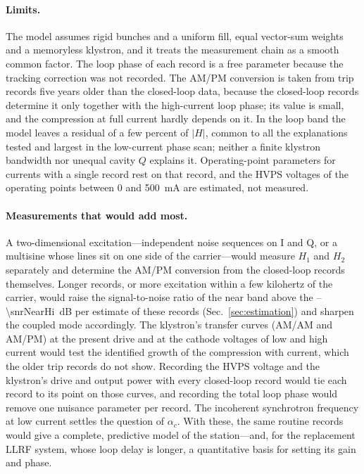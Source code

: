\paragraph{Limits.} The model assumes rigid bunches and a uniform fill, equal vector-sum weights and a memoryless klystron, and it treats the measurement chain as a smooth common factor. The loop phase of each record is a free parameter because the tracking correction was not recorded. The AM/PM conversion is taken from trip records five years older than the closed-loop data, because the closed-loop records determine it only together with the high-current loop phase; its value is small, and the compression at full current hardly depends on it. In the loop band the model leaves a residual of a few percent of $|H|$, common to all the explanations tested and largest in the low-current phase scan; neither a finite klystron bandwidth nor unequal cavity $Q$ explains it. Operating-point parameters for currents with a single record rest on that record, and the HVPS voltages of the operating points between \SI{0}{} and \SI{500}{mA} are estimated, not measured.

\paragraph{Measurements that would add most.} A two-dimensional excitation---independent noise sequences on I and Q, or a multisine whose lines sit on one side of the carrier---would measure $H_1$ and $H_2$ separately and determine the AM/PM conversion from the closed-loop records themselves. Longer records, or more excitation within a few kilohertz of the carrier, would raise the signal-to-noise ratio of the near band above the \snrNearLo--\SI{\snrNearHi}{dB} per estimate of these records (Sec.~\ref{sec:estimation}) and sharpen the coupled mode accordingly. The klystron's transfer curves (AM/AM and AM/PM) at the present drive and at the cathode voltages of low and high current would test the identified growth of the compression with current, which the older trip records do not show. Recording the HVPS voltage and the klystron's drive and output power with every closed-loop record would tie each record to its point on those curves, and recording the total loop phase would remove one nuisance parameter per record. The incoherent synchrotron frequency at low current settles the question of $\alpha_c$. With these, the same routine records would give a complete, predictive model of the station---and, for the replacement LLRF system, whose loop delay is longer, a quantitative basis for setting its gain and phase.

